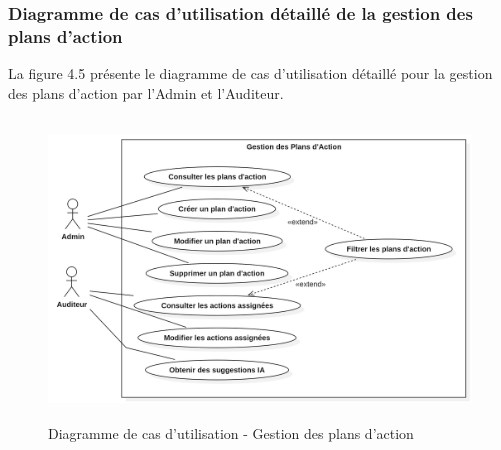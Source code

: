 \subsubsection{Diagramme de cas d'utilisation détaillé de la gestion des plans d'action}
\noindent La figure 4.5 présente le diagramme de cas d'utilisation détaillé pour la gestion des plans d'action par l'Admin et l'Auditeur.

\begin{figure}[H]
    \centering
    \includegraphics[width=12cm,height=8cm]{images/actionplansuc.png}
    \caption{Diagramme de cas d'utilisation - Gestion des plans d'action}
\end{figure}

